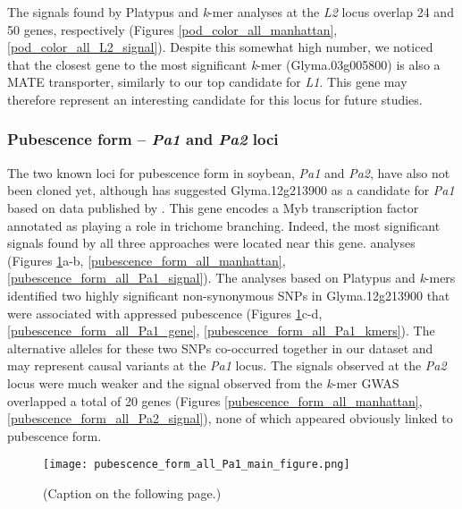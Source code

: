 The signals found by Platypus and \emph{k}-mer analyses at the \textit{L2}
locus overlap 24 and 50 genes, respectively (Figures
\ref{pod_color_all_manhattan}, \ref{pod_color_all_L2_signal}). Despite this
somewhat high number, we noticed that the closest gene to the
most significant \emph{k}-mer (Glyma.03g005800) is also a MATE transporter,
similarly to our top candidate for \emph{L1}. This gene may therefore represent
an interesting candidate for this locus for future studies.

\subsubsection*{Pubescence form -- \textit{Pa1} and \textit{Pa2} loci}
\label{sv-gwas-main-results-pubescence-form-pa1-pa2}

The two known loci for pubescence form in soybean, \textit{Pa1} and
\textit{Pa2}, have also not been cloned yet, although \cite{gilbert2017} has suggested
Glyma.12g213900 as a candidate for \textit{Pa1} based on data published
by \cite{bandillo2017}. This gene encodes a Myb transcription factor annotated
as playing a role in trichome branching. Indeed, the most
significant signals found by all three approaches were located near this gene.
analyses (Figures \ref{pubescence-form-main-figure}a-b,
\ref{pubescence_form_all_manhattan}, \ref{pubescence_form_all_Pa1_signal}).
The analyses based on Platypus and \emph{k}-mers identified two highly
significant non-synonymous SNPs in Glyma.12g213900 that were associated with appressed pubescence
(Figures \ref{pubescence-form-main-figure}c-d, \ref{pubescence_form_all_Pa1_gene},
\ref{pubescence_form_all_Pa1_kmers}). The alternative alleles for these two
SNPs co-occurred together in our dataset and may represent causal variants at
the \emph{Pa1} locus. The signals observed at the \emph{Pa2} locus were much
weaker and the signal observed from the \emph{k}-mer GWAS overlapped a total of
20 genes (Figures \ref{pubescence_form_all_manhattan},
\ref{pubescence_form_all_Pa2_signal}), none of which appeared obviously linked
to pubescence form.

\begin{figure}
	\centering
	\texttt{[image: pubescence\_form\_all\_Pa1\_main\_figure.png]}
	\caption[Results of SNP/indel- and \textit{k}-mer-based GWAS at the
	\textit{Pa1} locus for pubescence form]{(Caption on the following page.)}
	\label{pubescence-form-main-figure}
\end{figure}

